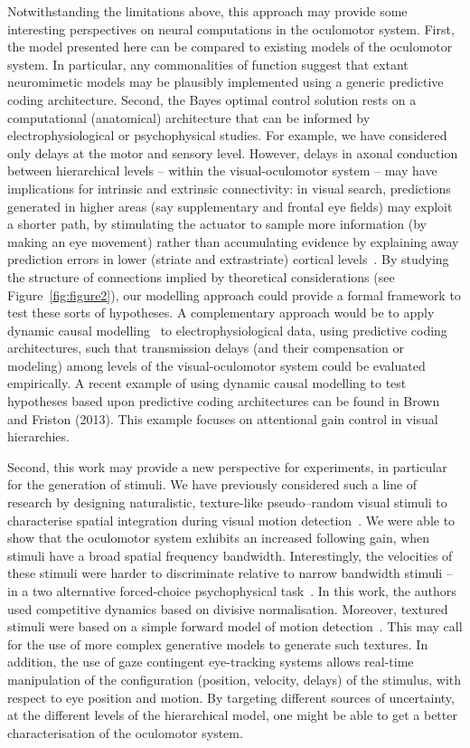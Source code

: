 \documentclass[a4paper]{article} %
\begin{document}
Notwithstanding the limitations above, this approach may provide some interesting perspectives on neural computations in the oculomotor system. First, the model presented here can be compared to existing models of the oculomotor system. In particular, any commonalities of function suggest that extant neuromimetic models may be plausibly implemented using a generic predictive coding architecture.  Second, the Bayes optimal control solution rests on a computational (anatomical) architecture that can be informed by electrophysiological or psychophysical studies. For example, we have considered only delays at the motor and sensory level. However, delays in axonal conduction between hierarchical levels -- within the visual-oculomotor system -- may have implications for intrinsic and extrinsic connectivity: in visual search, predictions generated in higher areas (say supplementary and frontal eye fields) may exploit a shorter path, by stimulating the actuator to sample more information (by making an eye movement) rather than accumulating evidence by explaining away prediction errors in lower (striate and extrastriate) cortical levels~\citep{Masson10}. By studying the structure of connections implied by theoretical considerations (see Figure~\ref{fig:figure2}), our modelling approach could provide a formal framework to test these sorts of hypotheses. A complementary approach would be to apply dynamic causal modelling~\citep{Friston03a} to electrophysiological data, using predictive coding architectures, such that transmission delays (and their compensation or modeling) among levels of the visual-oculomotor system could be evaluated empirically. %
A recent example of using dynamic causal modelling to test hypotheses based upon predictive coding architectures can be found in Brown and Friston (2013). This example focuses on attentional gain control in visual hierarchies.

Second, this work may provide a new perspective for experiments, in
particular for the generation of stimuli. We have previously considered
such a line of research by designing naturalistic, texture-like
pseudo--random visual stimuli to characterise spatial integration during
visual motion detection~\citep{Leon12a}. We were able to show that
the oculomotor system exhibits an increased following gain, when stimuli
have a broad spatial frequency bandwidth. Interestingly, the velocities
of these stimuli were harder to discriminate relative to narrow
bandwidth stimuli -- in a two alternative forced-choice psychophysical
task~\citep{Simoncini12}. In this work, the authors used competitive
dynamics based on divisive normalisation. Moreover, textured stimuli
were based on a simple forward model of motion detection~\citep{Leon12a}. This may call for the use of more complex generative models to
generate such textures. In addition, the use of gaze contingent
eye-tracking systems allows real-time manipulation of the configuration
(position, velocity, delays) of the stimulus, with respect to eye
position and motion. By targeting different sources of uncertainty, at
the different levels of the hierarchical model, one might be able to get
a better characterisation of the oculomotor system.
\end{document}
